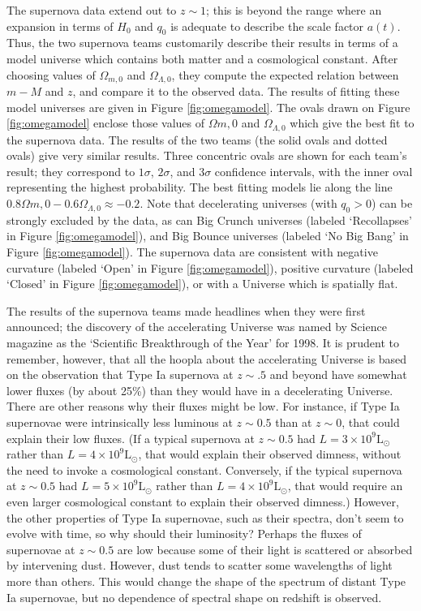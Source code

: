 \documentclass[a4paper,11pt]{article}
\begin{document}
{\noindent}The supernova data extend out to $z\sim1$; this is beyond the range where an expansion in terms of $H_0$ and $q_0$ is adequate to describe the scale factor $a(t)$. Thus, the two supernova teams customarily describe their results in terms of a model universe which contains both matter and a cosmological constant. After choosing values of $\Omega_{m,0}$ and $\Omega_{\Lambda,0}$, they compute the expected relation between $m − M$ and $z$, and compare it to the observed data. The results of fitting these model universes are given in Figure \ref{fig:omegamodel}. The ovals drawn on Figure \ref{fig:omegamodel} enclose those values of $\Omega{m,0}$ and $\Omega_{\Lambda,0}$ which give the best fit to the supernova data. The results of the two teams (the solid ovals and dotted ovals) give very similar results. Three concentric ovals are shown for each team’s result; they correspond to $1\sigma$, $2\sigma$, and $3\sigma$ confidence intervals, with the inner oval representing the highest probability. The best fitting models lie along the line $0.8\Omega{m,0} − 0.6\Omega_{\Lambda,0}≈ −0.2.$ Note that decelerating universes (with $q_0>0$) can be strongly excluded by the data, as can Big Crunch universes (labeled `Recollapses' in Figure \ref{fig:omegamodel}), and Big Bounce universes (labeled `No Big Bang' in Figure \ref{fig:omegamodel}). The supernova data are consistent with negative curvature (labeled `Open' in Figure \ref{fig:omegamodel}), positive curvature (labeled `Closed' in Figure \ref{fig:omegamodel}), or with a Universe which is spatially flat.

{\noindent}The results of the supernova teams made headlines when they were first announced; the discovery of the accelerating Universe was named by Science magazine as the `Scientific Breakthrough of the Year' for 1998. It is prudent to remember, however, that all the hoopla about the accelerating Universe is based on the observation that Type Ia supernova at $z\sim.5$ and beyond have somewhat lower fluxes (by about 25\%) than they would have in a decelerating Universe. There are other reasons why their fluxes might be low. For instance, if Type Ia supernovae were intrinsically less luminous at $z\sim0.5$ than at $z\sim0$, that could explain their low fluxes. (If a typical supernova at $z\sim0.5$ had $L=3\times10^9\mathrm{L}_\odot$ rather than $L=4\times10^9\mathrm{L}_\odot$, that would explain their observed dimness, without the need to invoke a cosmological constant. Conversely, if the typical supernova at $z\sim0.5$ had $L=5\times10^9\mathrm{L}_\odot$ rather than $L=4\times10^9\mathrm{L}_\odot$, that would require an even larger cosmological constant to explain their observed dimness.) However, the other properties of Type Ia supernovae, such as their spectra, don’t seem to evolve with time, so why should their luminosity? Perhaps the fluxes of supernovae at $z\sim0.5$ are low because some of their light is scattered or absorbed by intervening dust. However, dust tends to scatter some wavelengths of light more than others. This would change the shape of the spectrum of distant Type Ia supernovae, but no dependence of spectral shape on redshift is observed.
\end{document}
